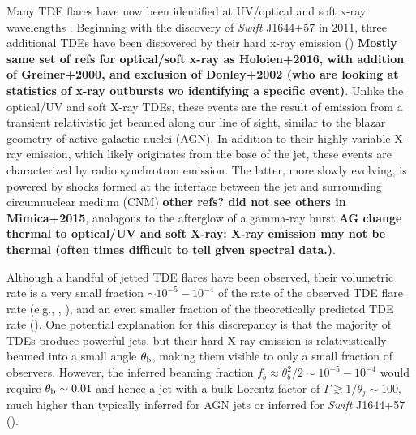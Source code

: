 \documentclass[usenatbib,fleqn]{mnras}
\begin{document}
Many TDE flares have now been identified at UV/optical
\citep{Gezari+2008, Gezari+2009, van-Velzen+2011, Gezari+2012,
  Arcavi+2014, Chornock+2014, Holoien+2014, Vinko+2015, Holoien+2016}
and soft x-ray wavelengths \citep{Bade+1996, Grupe+1999,
  Komossa&Greiner1999, Greiner+2000, Esquej+2007, Maksym+2010,
  Saxton+2012}. Beginning with the discovery of {\it Swift} J1644+57
in 2011, three additional TDEs have been discovered by their hard
x-ray emission (\citealt{Bloom+2011, Levan+2011, Burrows+2011,
  Zauderer+2011, Cenko+2012, Pasham+2015, Brown+2015}) {\bf Mostly
  same set of refs for optical/soft x-ray as Holoien+2016, with
  addition of Greiner+2000, and exclusion of Donley+2002 (who are
  looking at statistics of x-ray outbursts wo identifying a specific
  event)}.  Unlike the optical/UV and soft X-ray TDEs, these events
are the result of emission from a transient relativistic jet beamed
along our line of sight, similar to the blazar geometry of active
galactic nuclei (AGN).  In addition to their highly variable X-ray
emission, which likely originates from the base of the jet, these
events are characterized by radio synchrotron emission.  The latter,
more slowly evolving, is powered by shocks formed at the interface
between the jet and surrounding circumnuclear medium (CNM)
\citep{Bloom+2011,Giannios&Metzger2011,Metzger+2012,Mimica+2015} {\bf
  other refs? did not see others in Mimica+2015},
analagous to the afterglow of a gamma-ray burst {\bf AG change thermal
  to optical/UV and soft X-ray: X-ray emission may not be thermal
  (often times difficult to tell given spectral data.)}.

Although a handful of jetted TDE flares have been observed, their
volumetric rate is a very small fraction $\sim 10^{-5}-10^{-4}$ of the
rate of the observed TDE flare rate (e.g., \citealt{Burrows+2011},
\citealt{Brown+2015}), and an even smaller fraction of the
theoretically predicted TDE rate (\citealt{Stone&Metzger2016}).  One
potential explanation for this discrepancy is that the majority of
TDEs produce powerful jets, but their hard X-ray emission is
relativistically beamed into a small angle $\theta_{\rm b}$, making
them visible to only a small fraction of observers.  However, the
inferred beaming fraction $f_b \approx \theta_{b}^{2}/2 \sim
10^{-5}-10^{-4}$ would require $\theta_{\rm b} \sim 0.01$ and hence a
jet with a bulk Lorentz factor of $\Gamma \gtrsim 1/\theta_j \sim
100$, much higher than typically inferred for AGN jets or inferred for
{\it Swift} J1644+57 (\citealt{Metzger+2012}).
\end{document}
